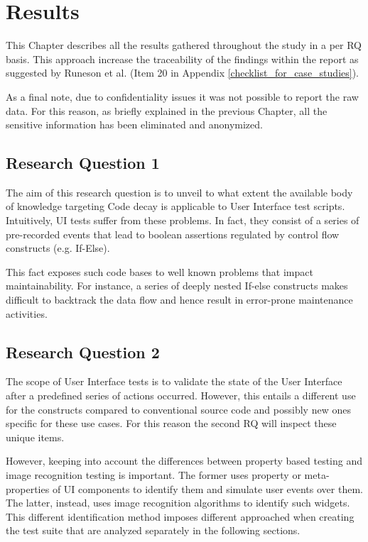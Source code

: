 \chapter{Results} \label{study_results}

This Chapter describes all the results gathered throughout the study in a per RQ basis. This approach increase the traceability of the findings within the report as suggested by Runeson et al. \cite{case_study_software_engineering} (Item 20 in Appendix \ref{checklist_for_case_studies}).

As a final note, due to confidentiality issues it was not possible to report the raw data. For this reason, as briefly explained in the previous Chapter, all the sensitive information has been eliminated and anonymized.

\section{Research Question 1}

The aim of this research question is to unveil to what extent the available body of knowledge targeting Code decay is applicable to User Interface test scripts. Intuitively, UI tests suffer from these problems. In fact, they consist of a series of pre-recorded events that lead to boolean assertions regulated by control flow constructs (e.g. If-Else).



This fact exposes such code bases to well known problems \cite{code_smell_definition,domain_specific_code_smells} that impact maintainability. For instance, a series of deeply nested If-else constructs makes difficult to backtrack the data flow and hence result in error-prone maintenance activities.

\section{Research Question 2}

The scope of User Interface tests is to validate the state of the User Interface after a predefined series of actions occurred. However, this entails a different use for the constructs compared to conventional source code and possibly new ones specific for these use cases. For this reason the second RQ will inspect these unique items.

However, keeping into account the differences between property based testing and image recognition testing is important. The former uses property or meta-properties of UI components to identify them and simulate user events over them. The latter, instead, uses image recognition algorithms to identify such widgets. This different identification method imposes different approached when creating the test suite that are analyzed separately in the following sections.

